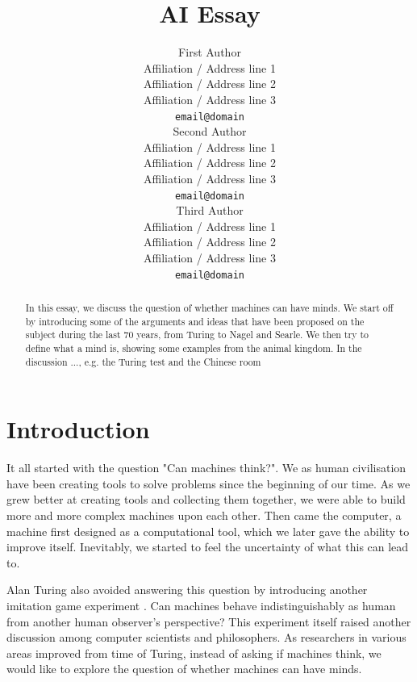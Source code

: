 \documentclass[11pt]{article}
\title{AI Essay}
\author{First Author \\
  Affiliation / Address line 1 \\
  Affiliation / Address line 2 \\
  Affiliation / Address line 3 \\
  {\tt email@domain} \\\And
  Second Author \\
  Affiliation / Address line 1 \\
  Affiliation / Address line 2 \\
  Affiliation / Address line 3 \\
  {\tt email@domain} \\\And
  Third Author \\
  Affiliation / Address line 1 \\
  Affiliation / Address line 2 \\
  Affiliation / Address line 3 \\
  {\tt email@domain} \\}
\date{}
\newcommand{\sk}[1]{{\color{dark-green-2} #1}}
\newcommand{\dr}[1]{{\color{dark-cornflower-blue-2} #1}}
\newenvironment{sketch}{\color{dark-green-2}}{\ignorespacesafterend}
\newenvironment{draft}{\color{dark-cornflower-blue-2}}{\ignorespacesafterend}
\begin{document}
\maketitle
\begin{abstract}
\sk{
In this essay, we discuss the question of whether machines can have minds. We start off by introducing some of the arguments and ideas that have been proposed on the subject during the last 70 years, from Turing to Nagel and Searle. We then try to define what a mind is, showing some examples from the animal kingdom. In the discussion ..., e.g. the Turing test and the Chinese room
}
\end{abstract}

\section{Introduction}
\label{sec:introduction}

\begin{draft}
It all started with the question "Can machines think?". We as human civilisation have been creating tools to solve problems since the beginning of our time. As we grew better at creating tools and collecting them together, we were able to build more and more complex machines upon each other. Then came the computer, a machine first designed as a computational tool, which we later gave the ability to improve itself. Inevitably, we started to feel the uncertainty of what this can lead to.

Alan Turing also  avoided answering this question by introducing another imitation game experiment \cite{turing1950computing}. Can machines behave indistinguishably as human from another human observer's perspective? This experiment itself raised another discussion among computer scientists and philosophers. As researchers in various areas improved from time of Turing, instead of asking if machines think, we would like to explore the question of whether machines can have minds.
\end{draft}


%
%
%
\end{document}
